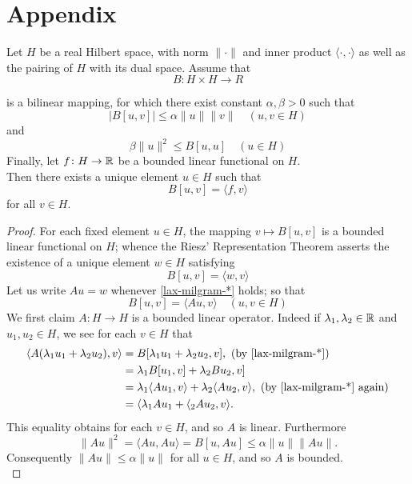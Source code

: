 \chapter{Appendix}

\begin{theorem}
Let $H$ be a real Hilbert space, with norm $\| \cdot \|$ and inner product $\langle \cdot, \cdot \rangle$ as well as the pairing of $H$ with its dual space. Assume that
	\[ B \colon H \times H \rightarrow R  \]

is a bilinear mapping, for which there exist constant $\alpha, \beta > 0$ such that
	\[ |B[u, v]| \leq \alpha \| u \| \| v \| \quad (u, v \in H) \]
and
	\[ \beta \| u \|^{2} \leq B[u, u] \quad ( u \in H) \]
Finally, let $f \colon H\rightarrow \mathbb{R}$ be a bounded linear functional on $H$. \\

Then there exists a unique element $u \in H$ such that
	\[ B[u, v] = \langle f, v \rangle\]
for all $v \in H$.

\begin{proof} %
	For each fixed element $u \in H$, the mapping $v \mapsto B[u, v]$ is a bounded linear functional on $H$; whence the Riesz' Representation Theorem asserts the existence of a unique element $w \in H$ satisfying
		\begin{equation}
			 B[u, v] = \langle w, v \rangle \label{lax-milgram-*}
		\end{equation}
	Let us write $A u = w$ whenever \eqref{lax-milgram-*} holds; so that
		\[ B[u, v] = \langle Au, v \rangle \quad (u, v \in H) \]
	We first claim $A \colon H \rightarrow H$ is a bounded linear operator. Indeed if $\lambda_{1}, \lambda_{2} \in \mathbb{R}$ and $u_{1}, u_{2} \in H$, we see for each $v \in H$ that
	\begin{align*}
		\langle A (\lambda_{1} u_{1} + \lambda_{2} u_{2}), v \rangle & = B[\lambda_{1} u_{1} + \lambda_{2} u_{2}, v], ~(\text{by \eqref{lax-milgram-*}}) \\
			& = \lambda_{1} B[u_{1}, v] + \lambda_{2} Bu_{2}, v] \\
			& = \lambda_{1} \langle A u_{1}, v \rangle + \lambda_{2} \langle A u_{2}, v \rangle, ~(\text{by \eqref{lax-milgram-*} again}) \\
			& = \langle \lambda_{1} A u_{1} + \langle_{2} A u_{2}, v \rangle.
	\end{align*}
	This equality obtains for each $v \in H$, and so $A$ is linear. Furthermore
	\[ \| A u \|^{2} = \langle A u, A u \rangle = B[u, Au] \leq \alpha \| u \| \| Au \|. \]
	Consequently $\| A u \| \leq \alpha \|u \|$ for all $u \in H$, and so $A$ is bounded. \\
	

\end{proof}
\end{theorem}
